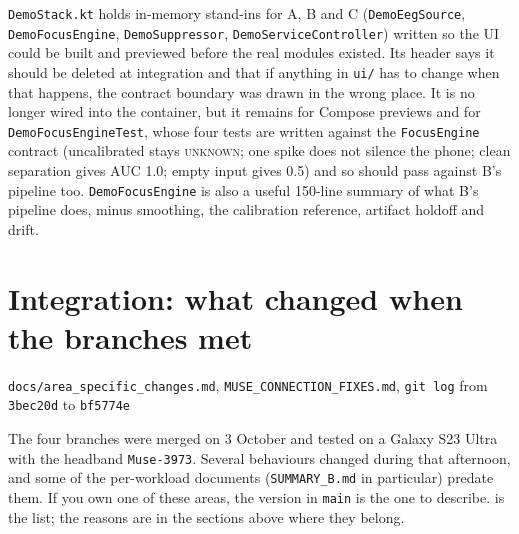 \documentclass[10pt,a4paper]{article}
\newcommand{\file}[1]{\texttt{\small #1}}          %
\newcommand{\code}[1]{\texttt{#1}}                  %
\newcommand{\state}[1]{\textsc{\small #1}}          %
\begin{document}
\file{DemoStack.kt} holds in-memory stand-ins for A, B and C (\code{DemoEegSource},
\code{DemoFocusEngine}, \code{DemoSuppressor}, \code{DemoServiceController}) written so the UI
could be built and previewed before the real modules existed. Its header says it should be deleted
at integration and that if anything in \code{ui/} has to change when that happens, the contract
boundary was drawn in the wrong place. It is no longer wired into the container, but it remains
for Compose previews and for \file{DemoFocusEngineTest}, whose four tests are written against the
\code{FocusEngine} contract (uncalibrated stays \state{unknown}; one spike does not silence the
phone; clean separation gives AUC 1.0; empty input gives 0.5) and so should pass against B's
pipeline too. \code{DemoFocusEngine} is also a useful 150-line summary of what B's pipeline does,
minus smoothing, the calibration reference, artifact holdoff and drift.
\section{Integration: what changed when the branches met}\label{sec:integration}

\begin{files}
\file{docs/area\_specific\_changes.md}, \file{MUSE\_CONNECTION\_FIXES.md}, \code{git log} from
\code{3bec20d} to \code{bf5774e}
\end{files}

The four branches were merged on 3 October and tested on a Galaxy S23 Ultra with the headband
\code{Muse-3973}. Several behaviours changed during that afternoon, and some of the per-workload
documents (\file{SUMMARY\_B.md} in particular) predate them. If you own one of these areas, the
version in \code{main} is the one to describe.  is the list; the reasons are
in the sections above where they belong.
\end{document}

